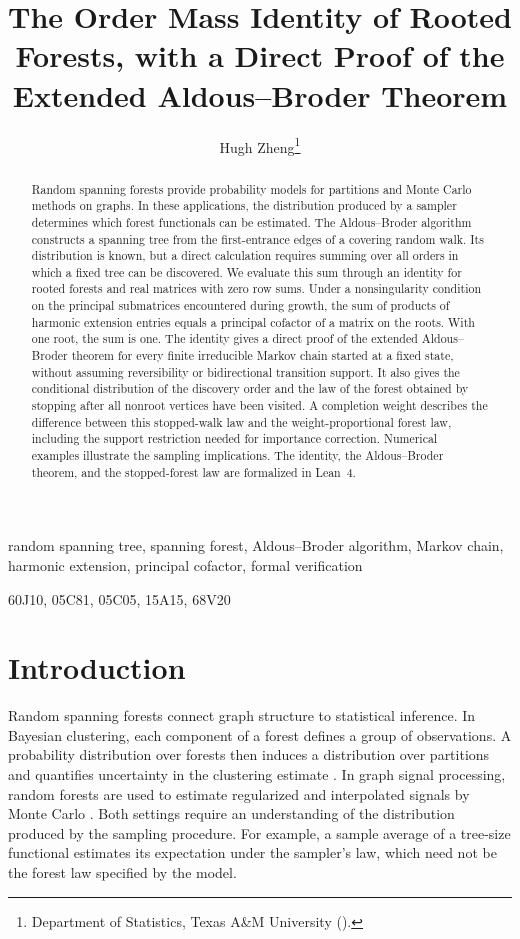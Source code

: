\documentclass[onefignum,onetabnum]{siamart250211}
\title{The Order Mass Identity of Rooted Forests, with a Direct Proof of the Extended Aldous--Broder Theorem}
\author{Hugh Zheng\thanks{Department of Statistics, Texas A\&M University (\email{hugh.zheng@tamu.edu}).}}
\numberwithin{theorem}{section}
\numberwithin{equation}{section}
\begin{document}
\maketitle

\begin{abstract}
Random spanning forests provide probability models for partitions and
Monte Carlo methods on graphs. In these applications, the distribution
produced by a sampler determines which forest functionals can be
estimated. The Aldous--Broder algorithm constructs a spanning tree from
the first-entrance edges of a covering random walk. Its distribution is
known, but a direct calculation requires summing over all orders in
which a fixed tree can be discovered. We evaluate this sum through an
identity for rooted forests and real matrices with zero row sums.
Under a nonsingularity condition on the principal submatrices
encountered during growth, the sum of products of harmonic extension
entries equals a principal cofactor of a matrix on the roots. With one
root, the sum is one. The identity gives a direct proof of the
extended Aldous--Broder theorem for every finite
irreducible Markov chain started at a fixed state, without assuming
reversibility or bidirectional transition support. It also gives the
conditional distribution of the discovery order and the law
of the forest obtained by stopping after all nonroot vertices have
been visited. A completion weight describes the difference between
this stopped-walk law and the weight-proportional forest law, including
the support restriction needed for importance correction. Numerical
examples illustrate the sampling implications. The identity, the
Aldous--Broder theorem, and the stopped-forest law are formalized in
Lean~4.
\end{abstract}

\begin{keywords}
random spanning tree, spanning forest, Aldous--Broder algorithm,
Markov chain, harmonic extension, principal cofactor, formal
verification
\end{keywords}

\begin{MSCcodes}
60J10, 05C81, 05C05, 15A15, 68V20
\end{MSCcodes}

\section{Introduction}\label{sec:intro}

Random spanning forests connect graph structure to statistical
inference. In Bayesian clustering, each component of a forest defines
a group of observations. A probability distribution over forests then
induces a distribution over partitions and quantifies uncertainty in
the clustering estimate \cite{LuoSangMallick2021,DuanRoy2024}. In graph
signal processing, random forests are used to estimate regularized and
interpolated signals by Monte Carlo
\cite{PilavciAmblardBarthelmeTremblay2021}. Both settings require an
understanding of the distribution produced by the sampling procedure.
For example, a sample average of a tree-size functional estimates its
expectation under the sampler's law, which need not be the forest law
specified by the model.
\end{document}
